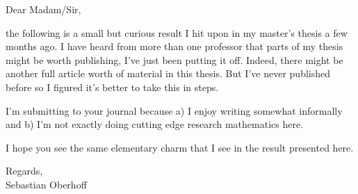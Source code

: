 \documentclass[]{letter}
\begin{document}

 
\begin{letter}


Dear Madam/Sir,

the following is a small but curious result I hit upon in my master's thesis a few months ago. I have heard from more than one professor that parts of my thesis might be worth publishing, I've just been putting it off. Indeed, there might be another full article worth of material in this thesis. But I've never published before so I figured it's better to take this in steps. 

I'm submitting to your journal because a) I enjoy writing somewhat informally and b) I'm not exactly doing cutting edge research mathematics here.

I hope you see the same elementary charm that I see in the result presented here.

Regards,\\
Sebastian Oberhoff

\end{letter}
\end{document}
